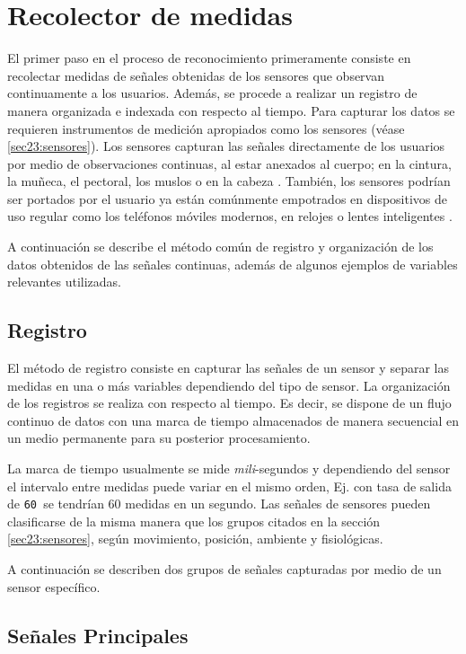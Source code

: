 \section{Recolector de medidas}

\label{sec43:recolector-datos}El primer paso en el proceso de reconocimiento
primeramente consiste en recolectar medidas de señales obtenidas de
los sensores que observan continuamente a los usuarios. Además, se
procede a realizar un registro de manera organizada e indexada con
respecto al tiempo. Para capturar los datos se requieren instrumentos
de medición apropiados como los sensores (véase \ref{sec23:sensores}).
Los sensores capturan las señales directamente de los usuarios por
medio de observaciones continuas, al estar anexados al cuerpo; en
la cintura, la muñeca, el pectoral, los muslos o en la cabeza \cite{Bao2004}.
También, los sensores podrían ser portados por el usuario ya están
comúnmente empotrados en dispositivos de uso regular como los teléfonos
móviles modernos, en relojes o lentes inteligentes \cite{LaraLabrador2012,Choudhury2008}.

A continuación se describe el método común de registro y organización
de los datos obtenidos de las señales continuas, además de algunos
ejemplos de variables relevantes utilizadas.

\subsection{Registro}

El método de registro consiste en capturar las señales de un sensor
y separar las medidas en una o más variables dependiendo del tipo
de sensor. La organización de los registros se realiza con respecto
al tiempo. Es decir, se dispone de un flujo continuo de datos con
una marca de tiempo almacenados de manera secuencial en un medio permanente
para su posterior procesamiento. 

La marca de tiempo usualmente se mide \emph{mili}-segundos y dependiendo
del sensor el intervalo entre medidas puede variar en el mismo orden,
Ej. con tasa de salida de \texttt{60  }se tendrían 60 medidas
en un segundo. Las señales de sensores pueden clasificarse de la misma
manera que los grupos citados en la sección \ref{sec23:sensores},
según movimiento, posición, ambiente y fisiológicas. 

A continuación se describen dos grupos de señales capturadas por medio
de un sensor específico.

\subsection{Señales Principales}

